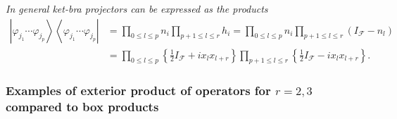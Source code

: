 \documentclass[aps,preprint]{revtex4}%
\begin{document}
\emph{In general ket-bra projectors can be expressed as the products }
\begin{align}
\left\vert \varphi_{j_{1}}\cdots\varphi_{j_{p}}\right\rangle \left\langle
\varphi_{j_{1}}\cdots\varphi_{j_{p}}\right\vert  &  =%
{\displaystyle\prod\limits_{0\leq l\leq p}}
n_{i}%
{\displaystyle\prod\limits_{p+1\leq l\leq r}}
h_{i}=%
{\displaystyle\prod\limits_{0\leq l\leq p}}
n_{i}%
{\displaystyle\prod\limits_{p+1\leq l\leq r}}
\left(  I_{\mathcal{F}}-n_{l}\right) \\
&  =%
{\displaystyle\prod\limits_{0\leq l\leq p}}
\left\{  \frac{1}{2}I_{\mathcal{F}}+ix_{l}x_{l+r}\right\}
{\displaystyle\prod\limits_{p+1\leq l\leq r}}
\left\{  \frac{1}{2}I_{\mathcal{F}}-ix_{l}x_{l+r}\right\}  .
\end{align}


\subsubsection{Examples of exterior product of operators for $r=2,3$ compared
to box products}
\end{document}
